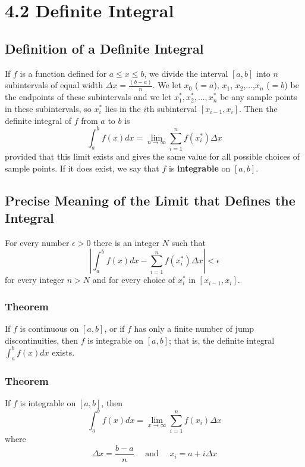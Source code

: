%
%

\section*{4.2 Definite Integral}

\subsection*{Definition of a Definite Integral}

If \(f\) is a function defined for \(a \leq x \leq b\), we divide the interval \([a, b]\) into \(n\) subintervals of equal width \(\Delta x=\frac{(b-a)}{n}\). We let \(x_0\) (\(=a\)), \(x_1\), \(x_2\),...,\(x_n\) (\(=b\)) be the endpoints of these subintervals and we let \(x_1^*, x_2^*, ..., x_n^*\) be any sample points in these subintervals, so \(x_i^*\) lies in the \(i\)th subinterval \([x_{i-1}, x_i]\). Then the definite integral of \(f\) from \(a\) to \(b\) is 
$$ \int_a^b f(x)dx=\lim_{n \to \infty} \sum_{i=1}^n f(x_i^*)\Delta x $$
provided that this limit exists and gives the same value for all possible choices of sample points. If it does exist, we say that \(f\) is \textbf{integrable} on \([a, b]\).

\subsection*{Precise Meaning of the Limit that Defines the Integral}

For every number \(\epsilon > 0\) there is an integer \(N\) such that
$$ \left|\int_a^b f(x)dx- \sum_{i=1}^n f(x_i^*)\Delta x\right|< \epsilon $$
for every integer \(n > N\) and for every choice of \(x_i^*\) in \([x_{i-1}, x_i]\).

\subsubsection*{Theorem}

If \(f\) is continuous on \([a, b]\), or if \(f\) has only a finite number of jump discontinuities, then \(f\) is integrable on \([a, b]\); that is, the definite integral \(\int_a^bf(x)dx\) exists.

\subsubsection*{Theorem}

If \(f\) is integrable on \([a, b]\), then
$$ \int_a^b f(x)dx=\lim_{x \to \infty} \sum_{i=1}^n f(x_i) \Delta x $$
where 
$$ \Delta x=\frac{b-a}{n} \quad \text{ and } \quad x_i=a+i \Delta x $$ 

